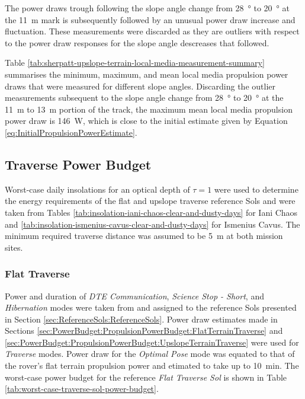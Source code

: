The power draws trough following the slope angle change from \SI{28}{\degree} to \SI{20}{\degree} at the \SI{11}{\meter} mark is subsequently followed by an unusual power draw increase and fluctuation. These measurements were discarded as they are outliers with respect to the power draw responses for the slope angle descreases that followed.

Table \ref{tab:sherpatt-upslope-terrain-local-media-measurement-summary} summarises the minimum, maximum, and mean local media propulsion power draws that were measured for different slope angles. Discarding the outlier measurements subsequent to the slope angle change from \SI{28}{\degree} to \SI{20}{\degree} at the \SI{11}{\meter} to \SI{13}{\meter} portion of the track, the maximum mean local media propulsion power draw is \SI{146}{\watt}, which is close to the initial estimate given by Equation \ref{eq:InitialPropulsionPowerEstimate}.



\pagebreak
\subsection{Traverse Power Budget}
\label{sec:PowerBudget:PowerBudget:TraversePowerBudget}
Worst-case daily insolations for an optical depth of $\tau = 1$ were used to determine the energy requirements of the flat and upslope traverse reference Sols and were taken from Tables \ref{tab:insolation-iani-chaos-clear-and-dusty-days} for Iani Chaos and \ref{tab:insolation-ismenius-cavus-clear-and-dusty-days} for Ismenius Cavus. The minimum required traverse distance was assumed to be \SI{5}{\meter} at both mission sites.

\subsubsection{Flat Traverse}
\label{sec:Design:PowerBudget:TraversePowerBudget:FlatTraverse}

Power and duration of \textit{DTE Communication}, \textit{Science Stop - Short}, and \textit{Hibernation} modes were taken from  and assigned to the reference Sols presented in Section \ref{sec:ReferenceSols:ReferenceSols}. Power draw estimates made in Sections \ref{sec:PowerBudget:PropulsionPowerBudget:FlatTerrainTraverse} and \ref{sec:PowerBudget:PropulsionPowerBudget:UpslopeTerrainTraverse} were used for \textit{Traverse} modes. Power draw for the \textit{Optimal Pose} mode was equated to that of the rover's flat terrain propulsion power and etimated to take up to \SI{10}{\minute}. The worst-case power budget for the reference \textit{Flat Traverse Sol} is shown in Table \ref{tab:worst-case-traverse-sol-power-budget}.

